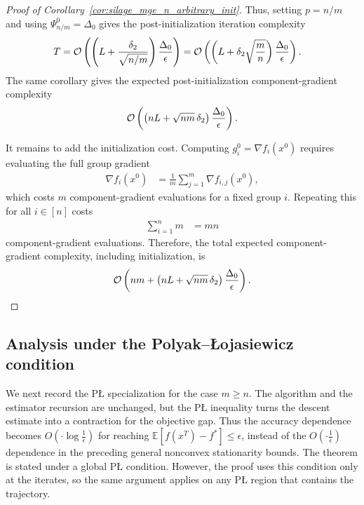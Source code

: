\documentclass{article}
\newcommand{\bb}{\mathbb}
\newcommand{\cO}{{\cal O}}
\newcommand{\fstar}{f^*}
\newcommand{\Exp}[1]{{\bb E}\left[#1\right]}
\newcommand{\rb}[1]{\left(#1\right)}
\newcommand {\rbl}[1]{(#1)} %
\newcommand{\nfi}[1]{\nabla f_i\rbl{#1}}
\theoremstyle{plain}
\begin{document}
\begin{proof}[Proof of Corollary~\ref{cor:silage_mge_n_arbitrary_init}]
Thus, setting $p=n/m$ and using $\Psi_{n/m}^0=\Delta_0$ gives the post-initialization iteration complexity
\begin{align*}
T
&=
\cO\rb{
\rb{
L+\frac{\delta_2}{\sqrt{n/m}}
}
\frac{\Delta_0}{\epsilon}
}
=
\cO\rb{
\rb{
L+\delta_2\sqrt{\frac{m}{n}}
}
\frac{\Delta_0}{\epsilon}
}.
\end{align*}
The same corollary gives the expected post-initialization component-gradient complexity
\begin{align*}
\cO\rb{
\rb{
nL+\sqrt{nm}\,\delta_2
}
\frac{\Delta_0}{\epsilon}
}.
\end{align*}

It remains to add the initialization cost. Computing $g_i^0=\nfi{x^0}$ requires evaluating the full group gradient
\begin{align*}
\nfi{x^0}
&=
\frac1m\sum_{j=1}^m \nabla f_{i,j}(x^0),
\end{align*}
which costs $m$ component-gradient evaluations for a fixed group $i$. Repeating this for all $i\in[n]$ costs
\begin{align*}
\sum_{i=1}^n m
&=
mn
\end{align*}
component-gradient evaluations. Therefore, the total expected component-gradient complexity, including initialization, is
\begin{align*}
\cO\rb{
nm +
\rb{
nL+\sqrt{nm}\,\delta_2
}
\frac{\Delta_0}{\epsilon}
}.
\end{align*}
\end{proof}

\subsection{Analysis under the Polyak--\L{}ojasiewicz condition}\label{sec:app-pl-mge-n}

We next record the P\L{} specialization for the case $m\ge n$.
The algorithm and the estimator recursion are unchanged, but the P\L{} inequality turns the descent estimate into a contraction for the objective gap.
Thus the accuracy dependence becomes $O\left(\cdot\log\frac{1}{\epsilon}\right)$ for reaching $\Exp{f(x^T)-\fstar}\le \epsilon$, instead of the $O\left(\cdot\frac{1}{\epsilon}\right)$ dependence in the preceding general nonconvex stationarity bounds.
The theorem is stated under a global P\L{} condition.
However, the proof uses this condition only at the iterates, so the same argument applies on any P\L{} region that contains the trajectory.
\end{document}
